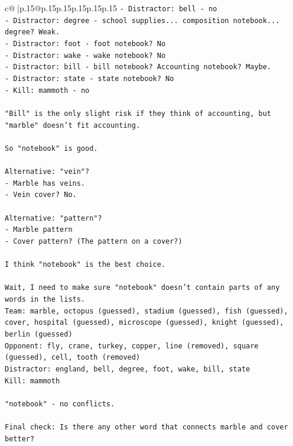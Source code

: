 \documentclass{article}
\begin{document}
{\begin{supertabular}{c@{$\;$}|p{.15\linewidth}@{}p{.15\linewidth}p{.15\linewidth}p{.15\linewidth}p{.15\linewidth}p{.15\linewidth}}
{{{\texttt{{-} Distractor: bell {-} no} \\
\texttt{{-} Distractor: degree {-} school supplies... composition notebook... degree? Weak.} \\
\texttt{{-} Distractor: foot {-} foot notebook? No} \\
\texttt{{-} Distractor: wake {-} wake notebook? No} \\
\texttt{{-} Distractor: bill {-} bill notebook? Accounting notebook? Maybe.} \\
\texttt{{-} Distractor: state {-} state notebook? No} \\
\texttt{{-} Kill: mammoth {-} no} \\
\\ 
\texttt{"Bill" is the only slight risk if they think of accounting, but "marble" doesn't fit accounting.} \\
\\ 
\texttt{So "notebook" is good.} \\
\\ 
\texttt{Alternative: "vein"?} \\
\texttt{{-} Marble has veins.} \\
\texttt{{-} Vein cover? No.} \\
\\ 
\texttt{Alternative: "pattern"?} \\
\texttt{{-} Marble pattern} \\
\texttt{{-} Cover pattern? (The pattern on a cover?)} \\
\\ 
\texttt{I think "notebook" is the best choice.} \\
\\ 
\texttt{Wait, I need to make sure "notebook" doesn't contain parts of any words in the lists.} \\
\texttt{Team: marble, octopus (guessed), stadium (guessed), fish (guessed), cover, hospital (guessed), microscope (guessed), knight (guessed), berlin (guessed)} \\
\texttt{Opponent: fly, crane, turkey, copper, line (removed), square (guessed), cell, tooth (removed)} \\
\texttt{Distractor: england, bell, degree, foot, wake, bill, state} \\
\texttt{Kill: mammoth} \\
\\ 
\texttt{"notebook" {-} no conflicts.} \\
\\ 
\texttt{Final check: Is there any other word that connects marble and cover better?} \\
}}}
\end{supertabular}}
\end{document}
